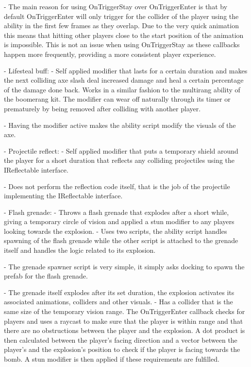         - The main reason for using OnTriggerStay over OnTriggerEnter is that by default OnTriggerEnter will only trigger for the collider of the player using the ability in the first few frames as they overlap. Due to the very quick animation this means that hitting other players close to the start position of the animation is impossible. This is not an issue when using OnTriggerStay as these callbacks happen more frequently, providing a more consistent player experience.

 - Lifesteal buff:
    - Self applied modifier that lasts for a certain duration and makes the next colliding axe slash deal increased damage and heal a certain percentage of the damage done back. Works in a similar fashion to the multirang ability of the boomerang kit. The modifier can wear off naturally through its timer or prematurely by being removed after colliding with another player. 
    
    - Having the modifier active makes the ability script modify the visuals of the axe. 
    
 - Projectile reflect:
    - Self applied modifier that puts a temporary shield around the player for a short duration that reflects any colliding projectiles using the IReflectable interface.
    
    - Does not perform the reflection code itself, that is the job of the projectile implementing the IReflectable interface. 
    
 - Flash grenade:
    - Throws a flash grenade that explodes after a short while, giving a temporary circle of vision and applied a stun modifier to any players looking towards the explosion. 
    - Uses two scripts, the ability script handles spawning of the flash grenade while the other script is attached to the grenade itself and handles the logic related to its explosion.
    
    - The grenade spawner script is very simple, it simply asks docking to spawn the prefab for the flash grenade. 
    
    - The grenade itself explodes after its set duration, the explosion activates its associated animations, colliders and other visuals.
    - Has a collider that is the same size of the temporary vision range. The OnTriggerEnter callback checks for players and uses a raycast to make sure that the player is within range and that there are no obstructions between the player and the explosion. A dot product is then calculated between the player's facing direction and a vector between the player's and the explosion's position to check if the player is facing towards the bomb. A stun modifier is then applied if these requirements are fulfilled. 

